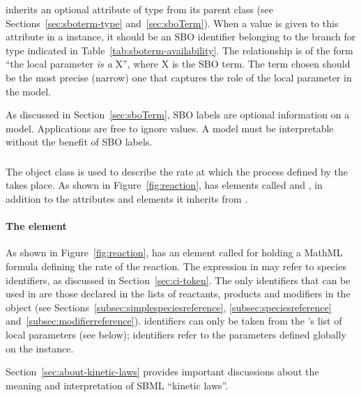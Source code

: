 \LocalParameter inherits an optional 
attribute of type  from its parent
class \SBase (see Sections~\ref{sec:sboterm-type}
and~\ref{sec:sboTerm}).  When a value is given to this
attribute in a  \LocalParameter instance, it should be an
SBO identifier belonging to the branch for type  \LocalParameter
indicated in Table~\ref{tab:sboterm-availability}.  The relationship is
of the form ``the local parameter \emph{is a} X'', where X is
the SBO term.  The term chosen should be the most precise (narrow)
one that captures the role of the local parameter in the model.

As discussed in Section~\ref{sec:sboTerm}, SBO labels are optional
information on a model.  Applications are free to ignore
 values.  A model must be interpretable without the
benefit of SBO labels.

\subsubsection{}
\label{subsec:kinetic-law}
\label{subsec:listoflocalparameters}

The \KineticLaw object class is used to describe the rate at which
the process defined by the \Reaction takes place.  As shown in
Figure~\vref{fig:reaction}, \KineticLaw has elements called
 and , in addition to the
attributes and elements it inherits from \SBase.

\paragraph{The  element}

As shown in Figure~\vref{fig:reaction}, \KineticLaw 
has an element called  for holding a MathML formula
defining the rate of the reaction.  The expression in 
may refer to species identifiers, as discussed in
Section~\ref{sec:ci-token}.  The only \Species identifiers that
can be used in  are those declared in the lists of
reactants, products and modifiers in the \Reaction object (see
Sections~\ref{subsec:simplespeciesreference},
\ref{subsec:speciesreference} and~\ref{subsec:modifierreference}).
\LocalParameter identifiers can only be taken from the \KineticLaw's list of
local parameters (see below); \Parameter identifiers refer to the parameters defined globally on
the \Model instance.

Section~\ref{sec:about-kinetic-laws} provides important
discussions about the meaning and interpretation of SBML ``kinetic
laws''.



